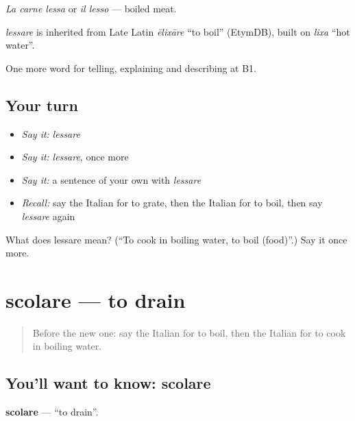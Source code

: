 \emph{La carne lessa} or \emph{il lesso} — boiled meat.

\begin{cousinweb}
\emph{lessare} is inherited from Late Latin \emph{ēlixāre} \textquotedblleft{}to boil\textquotedblright{} (EtymDB), built on \emph{lixa} \textquotedblleft{}hot water\textquotedblright{}.
\end{cousinweb}

\begin{grammarlens}[title={What you've built}]
One more word for telling, explaining and describing at B1.
\end{grammarlens}

\subsection*{Your turn}
\begin{itemize}
\raggedright
  \item \emph{Say it:} \emph{lessare}
  \item \emph{Say it:} \emph{lessare}, once more
  \item \emph{Say it:} a sentence of your own with \emph{lessare}
  \item \emph{Recall:} say the Italian for to grate, then the Italian for to boil, then say \emph{lessare} again
\end{itemize}

\begin{tcolorbox}[breakable,colback=teal!4,colframe=teal!35!black,title={Before you move on}]
What does lessare mean? (\textquotedblleft{}To cook in boiling water, to boil (food)\textquotedblright{}.) Say it once more.
\end{tcolorbox}
\section[scolare]{scolare — to drain}

\label{lesson:IT-C333-scolare}



\begin{quote}
Before the new one: say the Italian for to boil, then the Italian for to cook in boiling water.
\end{quote}

\subsection*{You'll want to know: scolare}
\textbf{scolare} — \textquotedblleft{}to drain\textquotedblright{}.

